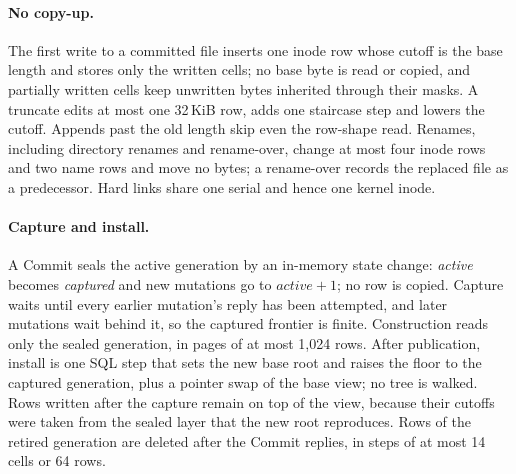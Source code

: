 \paragraph{No copy-up.} The first write to a committed file inserts one inode row whose
cutoff is the base length and stores only the written cells; no base byte is read or
copied, and partially written cells keep unwritten bytes inherited through their masks.
A truncate edits at most one 32\,KiB row, adds one staircase step and lowers the cutoff.
Appends past the old length skip even the row-shape read. Renames, including directory
renames and rename-over, change at most four inode rows and two name rows and move no
bytes; a rename-over records the replaced file as a predecessor. Hard links share one
serial and hence one kernel inode.

\paragraph{Capture and install.} A Commit seals the active generation by an in-memory
state change: \emph{active} becomes \emph{captured} and new mutations go to
$\mathit{active}+1$; no row is copied. Capture waits until every earlier mutation's reply
has been attempted, and later mutations wait behind it, so the captured frontier is
finite. Construction reads only the sealed generation, in pages of at most 1,024 rows.
After publication, install is one SQL step that sets the new base root and raises the
floor to the captured generation, plus a pointer swap of the base view; no tree is
walked. Rows written after the capture remain on top of the view, because their cutoffs
were taken from the sealed layer that the new root reproduces. Rows of the retired
generation are deleted after the Commit replies, in steps of at most 14 cells or 64 rows.


